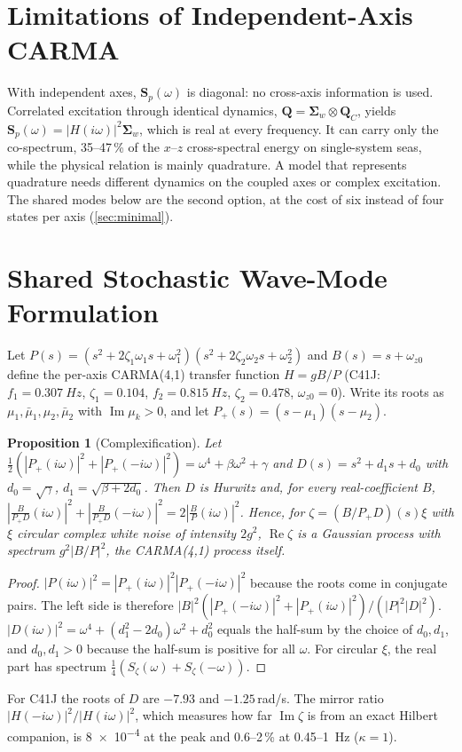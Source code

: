 \documentclass[conference]{IEEEtran}
\DeclareRobustCommand{\mat}[1]{\bm{#1}}
\theoremstyle{bodysmall}
\newtheorem{proposition}{Proposition}
\begin{document}
\section{Limitations of Independent-Axis CARMA}
With independent axes, $\mat S_p(\omega)$ is diagonal: no cross-axis
information is used. Correlated excitation through identical dynamics,
$\mat Q=\mat\Sigma_w\otimes\mat Q_C$, yields
$\mat S_p(\omega)=|H(i\omega)|^2\mat\Sigma_w$, which is real at every
frequency. It can carry only the co-spectrum, 35--47\,\% of the
$x$--$z$ cross-spectral energy on single-system seas, while the physical
relation is mainly quadrature. A model that represents quadrature needs
different dynamics on the coupled axes or complex excitation. The shared
modes below are the second option, at the cost of six instead of four
states per axis (\cref{sec:minimal}).

\section{Shared Stochastic Wave-Mode Formulation}
Let $P(s)=(s^2+2\zeta_1\omega_1s+\omega_1^2)(s^2+2\zeta_2\omega_2s+\omega_2^2)$
and $B(s)=s+\omega_{z0}$ define the per-axis CARMA(4,1) transfer function
$H=gB/P$ (C41J: $f_1=\SI{0.307}{Hz}$, $\zeta_1=0.104$, $f_2=\SI{0.815}{Hz}$,
$\zeta_2=0.478$, $\omega_{z0}=0$). Write its roots as
$\mu_1,\bar\mu_1,\mu_2,\bar\mu_2$ with $\operatorname{Im}\mu_k>0$, and let
$P_+(s)=(s-\mu_1)(s-\mu_2)$.
\begin{proposition}[Complexification]
\label{prop:cx}
Let $\tfrac12(|P_+(i\omega)|^2+|P_+(-i\omega)|^2)=\omega^4+\beta\omega^2+\gamma$
and $D(s)=s^2+d_1s+d_0$ with $d_0=\sqrt\gamma$, $d_1=\sqrt{\beta+2d_0}$.
Then $D$ is Hurwitz and, for every real-coefficient $B$,
$|\tfrac{B}{P_+D}(i\omega)|^2+|\tfrac{B}{P_+D}(-i\omega)|^2=2|\tfrac{B}{P}(i\omega)|^2$.
Hence, for $\zeta=(B/P_+D)(s)\xi$ with $\xi$ circular complex white noise of
intensity $2g^2$, $\operatorname{Re}\zeta$ is a Gaussian process with
spectrum $g^2|B/P|^2$, the CARMA(4,1) process itself.
\end{proposition}
\begin{proof}
$|P(i\omega)|^2=|P_+(i\omega)|^2|P_+(-i\omega)|^2$ because the roots come in
conjugate pairs. The left side is therefore
$|B|^2(|P_+(-i\omega)|^2+|P_+(i\omega)|^2)/(|P|^2|D|^2)$.
$|D(i\omega)|^2=\omega^4+(d_1^2-2d_0)\omega^2+d_0^2$ equals the
half-sum by the choice of $d_0,d_1$, and $d_0,d_1>0$ because the half-sum is
positive for all $\omega$. For circular $\xi$, the real part has spectrum
$\tfrac14(S_\zeta(\omega)+S_\zeta(-\omega))$.
\end{proof}
For C41J the roots of $D$ are $-7.93$ and $-1.25$\,rad/s. The mirror ratio
$|H(-i\omega)|^2/|H(i\omega)|^2$, which measures how far
$\operatorname{Im}\zeta$ is from an exact Hilbert companion, is
\num{8e-4} at the peak and 0.6--2\,\% at 0.45--\SI{1}{Hz} ($\kappa=1$).
\end{document}
